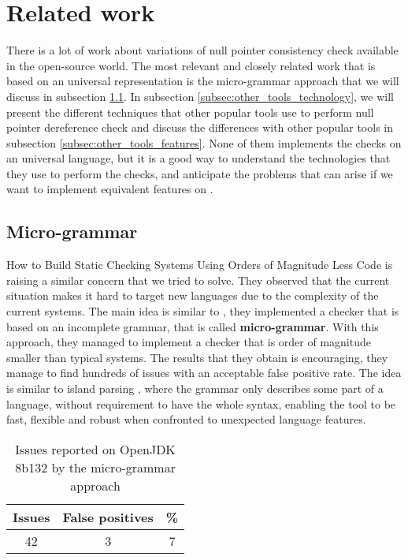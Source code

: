 \section{Related work}
\label{sec:related_work}

There is a lot of work about variations of null pointer consistency check available in the open-source world.
The most relevant and closely related work that is based on an universal representation is the micro-grammar approach \cite{Brown:2016:BSC:2954679.2872364} that we will discuss in subsection \ref{subsec:micro_grammar}.
In subsection \ref{subsec:other_tools_technology}, we will present the different techniques that other popular tools use to perform null pointer dereference check and discuss the differences with other popular tools in subsection \ref{subsec:other_tools_features}.
None of them implements the checks on an universal language, but it is a good way to understand the technologies that they use to perform the checks, and anticipate the problems that can arise if we want to implement equivalent features on \slang{}.

\subsection{Micro-grammar}
\label{subsec:micro_grammar}

How to Build Static Checking Systems Using Orders of Magnitude Less Code \cite{Brown:2016:BSC:2954679.2872364} is raising a similar concern that we tried to solve. 
They observed that the current situation makes it hard to target new languages due to the complexity of the current systems. 
The main idea is similar to \slang{}, they implemented a checker that is based on an incomplete grammar, that is called \textbf{micro-grammar}.
With this approach, they managed to implement a checker that is order of magnitude smaller than typical systems.
The results that they obtain is encouraging, they manage to find hundreds of issues with an acceptable false positive rate. 
The idea is similar to island parsing \cite{Moonen:2001}, where the grammar only describes some part of a language, without requirement to have the whole syntax, enabling the tool to be fast, flexible and robust when confronted to unexpected language features.

\begin{table}[h]
	\centering
	\caption{Issues reported on OpenJDK 8b132 by the micro-grammar approach}
	\label{table:micro_grammar_issues}
	\begin{tabular}{|c|c|c|}
		\hline
		\bf Issues & \bf False positives & \bf \% \\ \hline
		42 &  3 &  7 \\ \hline
	\end{tabular}
\end{table}

